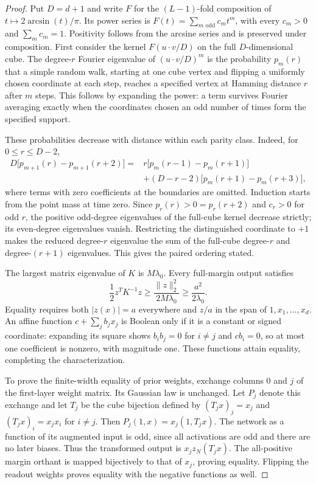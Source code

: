 \begin{proof}
Put $D=d+1$ and write $F$ for the $(L-1)$-fold composition of
$t\mapsto2\arcsin(t)/\pi$. Its power series is
$F(t)=\sum_{m\text{ odd}}c_mt^m$, with every $c_m>0$ and
$\sum_m c_m=1$. Positivity follows from the arcsine series and is
preserved under composition. First consider the kernel $F(u\cdot v/D)$
on the full $D$-dimensional cube. The degree-$r$ Fourier eigenvalue
of $(u\cdot v/D)^m$ is the probability $p_m(r)$ that a simple random
walk, starting at one cube vertex and flipping a uniformly chosen
coordinate at each step, reaches a specified vertex at Hamming
distance $r$ after $m$ steps. This follows by expanding the power:
a term survives Fourier averaging exactly when the coordinates
chosen an odd number of times form the specified support.

These probabilities decrease with distance within each parity class.
Indeed, for $0\le r\le D-2$,
\begin{align*}
 D\bigl[p_{m+1}(r)-p_{m+1}(r+2)\bigr]
 ={}&r\bigl[p_m(r-1)-p_m(r+1)\bigr]\\
 &+(D-r-2)\bigl[p_m(r+1)-p_m(r+3)\bigr],
\end{align*}
where terms with zero coefficients at the boundaries are omitted.
Induction starts from the point mass at time zero. Since
$p_r(r)>0=p_r(r+2)$ and $c_r>0$ for odd $r$, the positive odd-degree
eigenvalues of the full-cube kernel decrease strictly; its even-degree
eigenvalues vanish. Restricting the distinguished coordinate to $+1$
makes the reduced degree-$r$ eigenvalue the sum of the full-cube
degree-$r$ and degree-$(r+1)$ eigenvalues. This gives the paired
ordering stated.

The largest matrix eigenvalue of $K$ is $M\lambda_0$. Every
full-margin output satisfies
\[
 \frac12z^TK^{-1}z\ge\frac{\|z\|_2^2}{2M\lambda_0}
                     \ge\frac{a^2}{2\lambda_0}.
\]
Equality requires both $|z(x)|=a$ everywhere and
$z/a$ in the span of $1,x_1,\ldots,x_d$. An affine function
$c+\sum_j b_jx_j$ is Boolean only if it is a constant or signed
coordinate: expanding its square shows $b_ib_j=0$ for $i\ne j$
and $cb_i=0$, so at most one coefficient is nonzero, with magnitude
one. These functions attain equality, completing the characterization.

To prove the finite-width equality of prior weights, exchange
columns $0$ and $j$ of the first-layer weight matrix. Its Gaussian
law is unchanged. Let $P_j$ denote this exchange and let $T_j$ be
the cube bijection defined by $(T_jx)_j=x_j$ and
$(T_jx)_i=x_jx_i$ for $i\ne j$. Then
$P_j(1,x)=x_j(1,T_jx)$. The network as a function of its augmented
input is odd, since all activations are odd and there are no later
biases. Thus the transformed output is $x_j z_N(T_jx)$.
The all-positive margin orthant is mapped bijectively to that of
$x_j$, proving equality. Flipping the readout weights proves
equality with the negative functions as well.
\end{proof}

